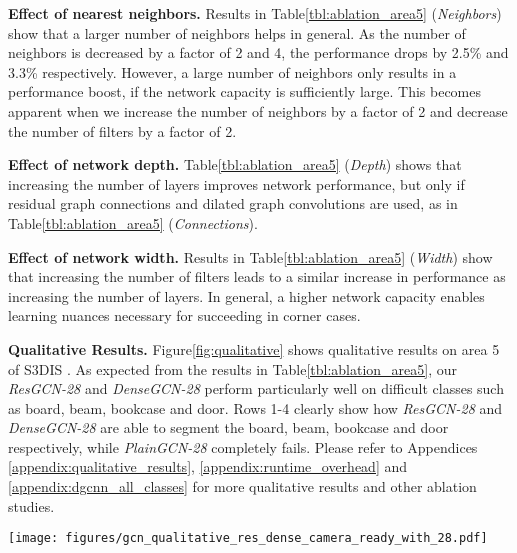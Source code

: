 \documentclass[10pt,twocolumn,letterpaper]{article}
\newcommand{\figLabel}{Figure\xspace}
\newcommand{\tblLabel}{Table\xspace}
\newcommand{\mysection}[1]{\vspace{3pt}\noindent\textbf{#1.}}
\begin{document}
\mysection{Effect of nearest neighbors} Results in \tblLabel \ref{tbl:ablation_area5} (\textit{Neighbors}) show that  a larger number of neighbors helps in general. As the number of neighbors is decreased by a factor of 2 and 4, the performance drops by 2.5\% and 3.3\% respectively. However, a large number of neighbors only results in a performance boost, if the network capacity is sufficiently large. This becomes apparent when we increase the number of neighbors by a factor of 2 and decrease the number of filters by a factor of 2.

\mysection{Effect of network depth}
\tblLabel \ref{tbl:ablation_area5} (\textit{Depth}) shows that increasing the number of layers improves network performance, but only if residual graph connections and dilated graph convolutions are used, as in \tblLabel \ref{tbl:ablation_area5} (\textit{Connections}).

\mysection{Effect of network width} Results in \tblLabel \ref{tbl:ablation_area5}  (\textit{Width}) show that increasing the number of filters leads to a similar increase in performance as increasing the number of layers. In general, a higher network capacity enables learning nuances necessary for succeeding in corner cases.

\mysection{Qualitative Results}
\figLabel \ref{fig:qualitative} shows qualitative results on area 5 of S3DIS \cite{2017arXiv170201105A}. As expected from the results in \tblLabel \ref{tbl:ablation_area5}, our \emph{ResGCN-28} and \emph{DenseGCN-28} perform particularly well on difficult classes such as board, beam, bookcase and door. Rows 1-4 clearly show how \emph{ResGCN-28} and \emph{DenseGCN-28} are able to segment the board, beam, bookcase and door respectively, while \emph{PlainGCN-28} completely fails. Please refer to Appendices \ref{appendix:qualitative_results}, \ref{appendix:runtime_overhead} and \ref{appendix:dgcnn_all_classes} for more qualitative results and other ablation studies.

\begin{figure*}[!h]
    \centering
    \texttt{[image: figures/gcn\_qualitative\_res\_dense\_camera\_ready\_with\_28.pdf]}
    \caption{\textbf{Qualitative Results on S3DIS Semantic Segmentation}. We show here the effect of adding residual and dense graph connections to deep GCNs. \emph{PlainGCN-28}, \emph{ResGCN-28}, and \emph{DenseGCN-28} are identical except for the presence of residual graph connections in \emph{ResGCN-28} and dense graph connections in \emph{DenseGCN-28}. We note how both residual and dense graph connections have a substantial effect on hard classes like board, bookcase, and sofa. These are lost in the results of \emph{PlainGCN-28}.}
    \label{fig:qualitative}
\end{figure*}
\end{document}
